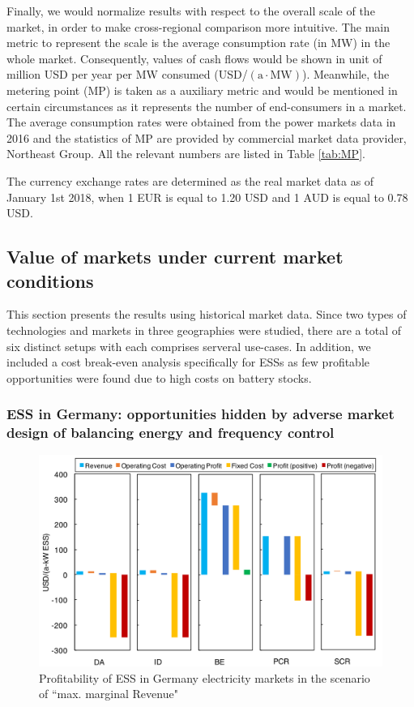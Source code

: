 Finally, we would normalize results with respect to the overall scale of the market, in order to make cross-regional comparison more intuitive. The main metric to represent the scale is the average consumption rate (in MW) in the whole market. Consequently, values of cash flows would be shown in unit of million USD per year per MW consumed (USD/$(\text{a} \cdot \text{MW})$). Meanwhile, the metering point (MP) is taken as a auxiliary metric and would be mentioned in certain circumstances as it represents the number of end-consumers in a market. The average consumption rates were obtained from the power markets data in 2016 and the statistics of MP are provided by commercial market data provider, Northeast Group\cite{NortheastGroup2016}\cite{NortheastGroup2017}\cite{NortheastGroup2017a}. All the relevant numbers are listed in Table \ref{tab:MP}.

The currency exchange rates are determined as the real market data as of January 1st 2018, when 1 EUR is equal to 1.20 USD and 1 AUD is equal to 0.78 USD\cite{Bloomberg}.

\subsection{Value of markets under current market conditions}
This section presents the results using historical market data. Since two types of technologies and markets in three geographies were studied, there are a total of six distinct setups with each comprises serveral use-cases. In addition, we included a cost break-even analysis specifically for ESSs as few profitable opportunities were found due to high costs on battery stocks.

\subsubsection{ESS in Germany: opportunities hidden by adverse market design of balancing energy and frequency control}

\begin{figure}[h!]
	\centering
	\includegraphics[width=0.9\linewidth]{Figures/Germany_ESS_profitability}
	\caption{Profitability of ESS in Germany electricity markets in the scenario of ``max. marginal Revenue"}
	\label{fig:germany-ess-profitability}
\end{figure}

